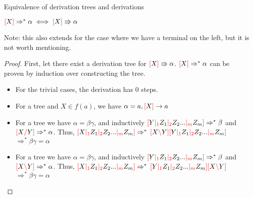 \documentclass[main.tex]{subfiles}
\begin{document}
\begin{prop}
    Equivalence of derivation trees and derivations

    $ \textcolor{red}{[} X \textcolor{red}{]} \Rightarrow^* \alpha \iff \textcolor{red}{[} X \textcolor{red}{]} \Rrightarrow \alpha $

    Note: this also extends for the case where we have a terminal on the left,
    but it is not worth mentioning.
\end{prop}
\begin{proof}
    First, let there exist a derivation tree for $ \textcolor{red}{[} X \textcolor{red}{]} \Rrightarrow \alpha $.
    $\textcolor{red}{[} X \textcolor{red}{]} \Rightarrow^* \alpha$ can be proven by induction over constructing
    the tree.
    \begin{itemize}
        \item For the trivial cases, the derivation has 0 steps.
        \item For a tree
            and $X \in f(a)$, we have $\alpha = a, \textcolor{red}{[} X \textcolor{red}{]} \rightarrow a$
        \item For a tree
            we have $\alpha = \beta \gamma$, and inductively
            $\textcolor{red}{[} Y \textcolor{red}{|_{1}} Z_1 \textcolor{red}{|_{2}} Z_2 ... \textcolor{red}{|_{m}} Z_m \textcolor{red}{]} \Rightarrow^* \beta$ and
            $\textcolor{red}{[} X \textcolor{red}{/} Y \textcolor{red}{]} \Rightarrow^* \alpha$. Thus,
            $\textcolor{red}{[} X \textcolor{red}{|_{1}} Z_1 \textcolor{red}{|_{2}} Z_2 ... \textcolor{red}{|_{m}} Z_m \textcolor{red}{]} \Rightarrow^*$
            $\textcolor{red}{[} X \textcolor{red}{\backslash} Y \textcolor{red}{]} \textcolor{red}{[} Y \textcolor{red}{|_{1}} Z_1 \textcolor{red}{|_{2}} Z_2 ... \textcolor{red}{|_{m}} Z_m \textcolor{red}{]}$
            $ \Rightarrow^* \beta \gamma = \alpha$
        \item For a tree
            we have $\alpha = \beta \gamma$, and inductively
            $\textcolor{red}{[} Y \textcolor{red}{|_{1}} Z_1 \textcolor{red}{|_{2}} Z_2 ... \textcolor{red}{|_{m}} Z_m \textcolor{red}{]} \Rightarrow^* \beta$ and
            $\textcolor{red}{[} X \textcolor{red}{\backslash} Y \textcolor{red}{]} \Rightarrow^* \alpha$. Thus,
            $\textcolor{red}{[} X \textcolor{red}{|_{1}} Z_1 \textcolor{red}{|_{2}} Z_2 ... \textcolor{red}{|_{m}} Z_m \textcolor{red}{]} \Rightarrow^*$
            $\textcolor{red}{[} Y \textcolor{red}{|_{1}} Z_1 \textcolor{red}{|_{2}} Z_2 ... \textcolor{red}{|_{m}} Z_m \textcolor{red}{]} \textcolor{red}{[} X \textcolor{red}{\backslash} Y \textcolor{red}{]}$
            $ \Rightarrow^* \beta \gamma = \alpha$
    \end{itemize}


\end{proof}
\end{document}
